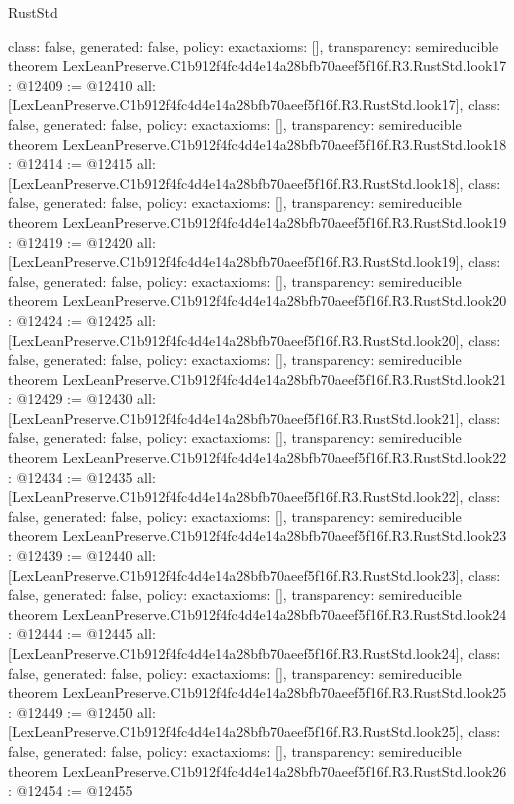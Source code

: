 \begin{lexlean}{RustStd}
\begin{coremodule}
{  class: false,
  generated: false,
  policy: exact{axioms: []},
  transparency: semireducible
}
theorem LexLeanPreserve.C1b912f4fc4d4e14a28bfb70aeef5f16f.R3.RustStd.look17 : @12409 := @12410 {
  all: [LexLeanPreserve.C1b912f4fc4d4e14a28bfb70aeef5f16f.R3.RustStd.look17],
  class: false,
  generated: false,
  policy: exact{axioms: []},
  transparency: semireducible
}
theorem LexLeanPreserve.C1b912f4fc4d4e14a28bfb70aeef5f16f.R3.RustStd.look18 : @12414 := @12415 {
  all: [LexLeanPreserve.C1b912f4fc4d4e14a28bfb70aeef5f16f.R3.RustStd.look18],
  class: false,
  generated: false,
  policy: exact{axioms: []},
  transparency: semireducible
}
theorem LexLeanPreserve.C1b912f4fc4d4e14a28bfb70aeef5f16f.R3.RustStd.look19 : @12419 := @12420 {
  all: [LexLeanPreserve.C1b912f4fc4d4e14a28bfb70aeef5f16f.R3.RustStd.look19],
  class: false,
  generated: false,
  policy: exact{axioms: []},
  transparency: semireducible
}
theorem LexLeanPreserve.C1b912f4fc4d4e14a28bfb70aeef5f16f.R3.RustStd.look20 : @12424 := @12425 {
  all: [LexLeanPreserve.C1b912f4fc4d4e14a28bfb70aeef5f16f.R3.RustStd.look20],
  class: false,
  generated: false,
  policy: exact{axioms: []},
  transparency: semireducible
}
theorem LexLeanPreserve.C1b912f4fc4d4e14a28bfb70aeef5f16f.R3.RustStd.look21 : @12429 := @12430 {
  all: [LexLeanPreserve.C1b912f4fc4d4e14a28bfb70aeef5f16f.R3.RustStd.look21],
  class: false,
  generated: false,
  policy: exact{axioms: []},
  transparency: semireducible
}
theorem LexLeanPreserve.C1b912f4fc4d4e14a28bfb70aeef5f16f.R3.RustStd.look22 : @12434 := @12435 {
  all: [LexLeanPreserve.C1b912f4fc4d4e14a28bfb70aeef5f16f.R3.RustStd.look22],
  class: false,
  generated: false,
  policy: exact{axioms: []},
  transparency: semireducible
}
theorem LexLeanPreserve.C1b912f4fc4d4e14a28bfb70aeef5f16f.R3.RustStd.look23 : @12439 := @12440 {
  all: [LexLeanPreserve.C1b912f4fc4d4e14a28bfb70aeef5f16f.R3.RustStd.look23],
  class: false,
  generated: false,
  policy: exact{axioms: []},
  transparency: semireducible
}
theorem LexLeanPreserve.C1b912f4fc4d4e14a28bfb70aeef5f16f.R3.RustStd.look24 : @12444 := @12445 {
  all: [LexLeanPreserve.C1b912f4fc4d4e14a28bfb70aeef5f16f.R3.RustStd.look24],
  class: false,
  generated: false,
  policy: exact{axioms: []},
  transparency: semireducible
}
theorem LexLeanPreserve.C1b912f4fc4d4e14a28bfb70aeef5f16f.R3.RustStd.look25 : @12449 := @12450 {
  all: [LexLeanPreserve.C1b912f4fc4d4e14a28bfb70aeef5f16f.R3.RustStd.look25],
  class: false,
  generated: false,
  policy: exact{axioms: []},
  transparency: semireducible
}
theorem LexLeanPreserve.C1b912f4fc4d4e14a28bfb70aeef5f16f.R3.RustStd.look26 : @12454 := @12455 {
}
\end{coremodule}
\end{lexlean}
